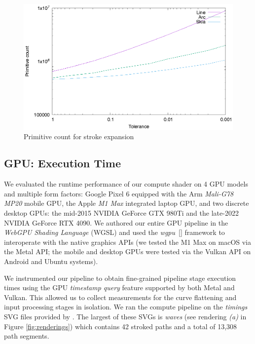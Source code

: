 \documentclass[sigconf, nonacm]{acmart}
\begin{document}
\begin{figure}
    \includegraphics[scale=0.6]{prim_count}
    \caption{Primitive count for stroke expansion}
    \label{fig:prim_count}
\end{figure}

\subsection{GPU: Execution Time} \label{subsection:gpu-results}

We evaluated the runtime performance of our compute shader on 4 GPU models and multiple form factors: Google Pixel 6 equipped with the Arm \emph{Mali-G78 MP20} mobile GPU, the Apple \emph{M1 Max} integrated laptop GPU, and two discrete desktop GPUs: the mid-2015 NVIDIA {GeForce GTX 980Ti} and the late-2022 NVIDIA {GeForce RTX 4090}. We authored our entire GPU pipeline in the \emph{WebGPU Shading Language} (WGSL) and used the \emph{wgpu}~[] framework to interoperate with the native graphics APIs (we tested the M1 Max on macOS via the Metal API; the mobile and desktop GPUs were tested via the Vulkan API on Android and Ubuntu systems).

We instrumented our pipeline to obtain fine-grained pipeline stage execution times using the GPU \emph{timestamp query} feature supported by both Metal and Vulkan. This allowed us to collect measurements for the curve flattening and input processing stages in isolation. We ran the compute pipeline on the \emph{timings} SVG files provided by \citet{Nehab2020}. The largest of these SVGs is \emph{waves} (see rendering \emph{(a)} in Figure \ref{fig:renderings}) which contains 42 stroked paths and a total of 13,308 path segments.
\end{document}
